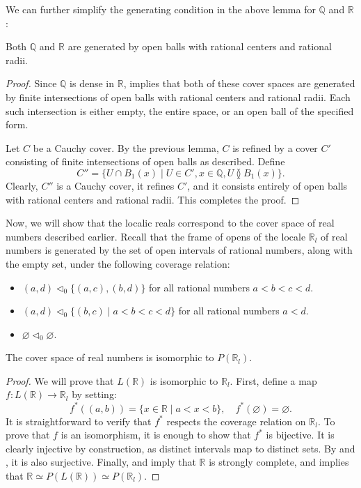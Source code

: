 \documentclass[reqno]{amsart}
\theoremstyle{definition}
\theoremstyle{remark}
\numberwithin{figure}{section}
\newcommand{\overlap}[2]{#1 \between #2}
\begin{document}
We can further simplify the generating condition in the above lemma for $\mathbb{Q}$ and $\mathbb{R}$:

\begin{lem}
Both $\mathbb{Q}$ and $\mathbb{R}$ are generated by open balls with rational centers and rational radii.
\end{lem}
\begin{proof}
Since $\mathbb{Q}$ is dense in $\mathbb{R}$,  implies that both of these cover spaces are generated by finite intersections of open balls with rational centers and rational radii.
Each such intersection is either empty, the entire space, or an open ball of the specified form.

Let $C$ be a Cauchy cover.
By the previous lemma, $C$ is refined by a cover $C'$ consisting of finite intersections of open balls as described.
Define
\[ C'' = \{ U \cap B_1(x) \mid U \in C', x \in \mathbb{Q}, \overlap{U}{B_1(x)} \}. \]
Clearly, $C''$ is a Cauchy cover, it refines $C'$, and it consists entirely of open balls with rational centers and rational radii.
This completes the proof.
\end{proof}

Now, we will show that the localic reals correspond to the cover space of real numbers described earlier.
Recall that the frame of opens of the locale $\mathbb{R}_l$ of real numbers is generated by the set of open intervals of rational numbers, along with the empty set, under the following coverage relation:
\begin{itemize}
\item $(a,d) \triangleleft_0 \{ (a,c), (b,d) \}$ for all rational numbers $a < b < c < d$.
\item $(a,d) \triangleleft_0 \{ (b,c) \mid a < b < c < d \}$ for all rational numbers $a < d$.
\item $\varnothing \triangleleft_0 \varnothing$.
\end{itemize}

\begin{prop}
The cover space of real numbers is isomorphic to $P(\mathbb{R}_l)$.
\end{prop}
\begin{proof}
We will prove that $L(\mathbb{R})$ is isomorphic to $\mathbb{R}_l$.
First, define a map $f : L(\mathbb{R}) \to \mathbb{R}_l$ by setting:
\[ f^*((a,b)) = \{ x \in \mathbb{R} \mid a < x < b \}, \quad f^*(\varnothing) = \varnothing. \]
It is straightforward to verify that $f^*$ respects the coverage relation on $\mathbb{R}_l$.
To prove that $f$ is an isomorphism, it is enough to show that $f^*$ is bijective.
It is clearly injective by construction, as distinct intervals map to distinct sets.
By  and , it is also surjective.
Finally,  and  imply that $\mathbb{R}$ is strongly complete, and  implies that $\mathbb{R} \simeq P(L(\mathbb{R})) \simeq P(\mathbb{R}_l)$.
\end{proof}
\end{document}
